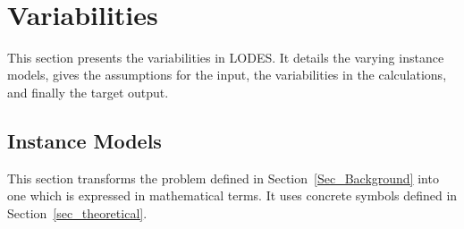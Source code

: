 \documentclass[12pt]{article}
\newcommand{\famname}{LODES} %
\begin{document}
~\newline

\section{Variabilities}
This section presents the variabilities in \famname{}. It details the varying instance models,
gives the assumptions for the input, the variabilities in the calculations, and
finally the target output.

\subsection{Instance Models} \label{sec_instance}    

This section transforms the problem defined in Section~\ref{Sec_Background} into 
one which is expressed in mathematical terms. It uses concrete symbols defined 
in Section~\ref{sec_theoretical}.

~\newline

\end{document}
